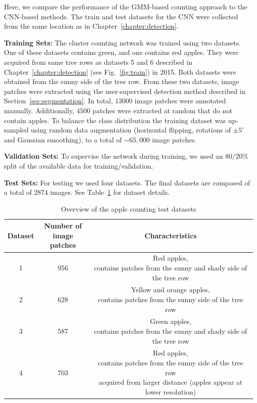 Here, we compare the performance of the GMM-based counting approach to the CNN-based methods.  The train and test datasets for the CNN were collected from the same location as in Chapter~\ref{chapter:detection}.

\textbf{Training Sets: }The cluster counting network was trained using two datasets. One of these datasets contains green, and one contains red apples. They were acquired from same tree rows as datasets 5 and 6 described in Chapter~\ref{chapter:detection} (see Fig.~\ref{fig:train}) in 2015. Both datasets were obtained from the sunny side of the tree row. From these two datasets, image patches were extracted using the user-supervised detection method described in Section~\ref{sec:segmentation}. In total, $13000$ image patches were annotated manually. Additionally, $4500$ patches were extracted at random that do not contain apples. To balance the class distribution the training dataset was up-sampled using random data augmentation (horizontal flipping, rotations of $\pm 5^\circ$ and Gaussian smoothing), to a total of $\sim65,000$ image patches.

\textbf{Validation Sets: }To supervise the network during training, we used an $80/20 \%$ split of the available data for training/validation.

\textbf{Test Sets: } For testing we used four datasets. The final datasets are composed of a total of $2874$ images. See Table~\ref{tab:datacount} for dataset details.

\begin{table}[ht!]
    \begin{center}
        \caption{Overview of the apple counting test datasets}
        \label{tab:datacount}
        \begin{tabular}{|c|c|c|}
            \hline
            \textbf{Dataset} & \specialcell{\textbf{Number of} \\ \textbf{image patches}}  & \textbf{Characteristics} \\
            \hline
            1 & 956 & \specialcell{Red apples, \\ contains patches from the sunny and shady side of the tree row}\\
            \hline
            2 & 628 & \specialcell{Yellow and orange apples, \\ contains patches from the sunny side of the tree row} \\
            \hline
            3 & 587 & \specialcell{Green apples, \\ contains patches from the sunny and shady side of the tree row} \\
            \hline
            4 & 703 & \specialcell{Red apples, \\ contains patches from the sunny side of the tree row \\ acquired from larger distance (apples appear at lower resolution)} \\
            \hline
        \end{tabular}
    \end{center}
\end{table}

